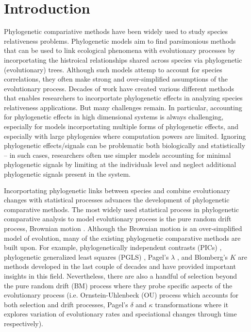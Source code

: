 \section{Introduction}

Phylogenetic compariative methods have been widely used to study species relativeness problems.
Phylogenetic models aim to find parsimonious methods that can be used to link ecological phenomena with evolutionary processes by incorportating the histroical relationships shared across species via phylogenetic (evolutionary) trees. 
Although such models attemp to account for species correlations, they often make strong and over-simplified assumptions of the evolutionary process. 
Decades of work have created various different methods that enables researchers to incorportate phylogenetic effects in analyzing species relativeness applications.
But many challenges remain.
In particular, accounting for phylogenetic effects in high dimensional systems is always challenging, especially for models incorportating multiple forms of phylogenetic effects, and especially with large phylogenies where computation powers are limited.
Ignoring phylogenetic effects/signals can be problematic both biologically and statistically \citep{felsenstein1985phylogenies, li2017statistical} -- in such cases, researchers often use simpler models accounting for minimal phylogenetic signals by limiting at the individuals level and neglect additional phylogenetic signals present in the system.

Incorportating phylogenetic links between species and combine evolutionary changes with statistical processes advances the development of phylogenetic comparative methods.
The most widely used statistical process in phylogenetic comparative analysis to model evolutionary process is the pure random drift process, Brownian motion \citep{felsenstein1973maximum}. 
Although the Brownian motion is an over-simplified model of evolution, many of the existing phylogenetic comparative methods are built upon.
For example, phylogenetically independent contrasts (PICs) \citep{felsenstein1985phylogenies}, phylogenetic generalized least squares (PGLS) \citep{grafen1989phylogenetic}, Pagel's $\lambda$ \citep{pagel1999inferring}, and Blomberg's $K$ \citep{blomberg2003testing} are methods developed in the last couple of decades and have provided important insights in this field. 
Nevertheless, there are also a handful of selection beyond the pure random drift (BM) process where they probe specific aspects of the evolutionary process (i.e. Ornstein-Uhlenbeck (OU) process which accounts for both selection and drift processes, Pagel's $\delta$ and $\kappa$ transformations where it explores variation of evolutionary rates and speciational changes through time respectively).

